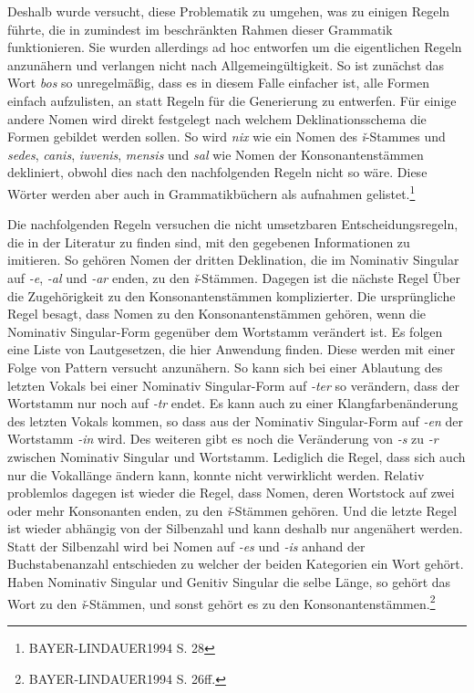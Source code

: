 \documentclass[12pt,abstract=on]{scrreprt}
\begin{document}
Deshalb wurde versucht, diese Problematik zu umgehen, was zu einigen Regeln führte, die in zumindest im beschränkten Rahmen dieser Grammatik funktionieren. Sie wurden allerdings ad hoc entworfen um die eigentlichen Regeln anzunähern und verlangen nicht nach Allgemeingültigkeit. So ist zunächst das Wort \textit{bos} so unregelmäßig, dass es in diesem Falle einfacher ist, alle Formen einfach aufzulisten, an statt Regeln für die Generierung zu entwerfen. Für einige andere Nomen wird direkt festgelegt nach welchem Deklinationsschema die Formen gebildet werden sollen. So wird \textit{nix} wie ein Nomen des \textit{ǐ}-Stammes und \textit{sedes}, \textit{canis}, \textit{iuvenis}, \textit{mensis} und \textit{sal} wie Nomen der Konsonantenstämmen dekliniert, obwohl dies nach den nachfolgenden Regeln nicht so wäre. Diese Wörter werden aber auch in Grammatikbüchern als aufnahmen gelistet.\footnote{BAYER-LINDAUER1994 S. 28} \par
Die nachfolgenden Regeln versuchen die nicht umsetzbaren Entscheidungsregeln, die in der Literatur zu finden sind, mit den gegebenen Informationen zu imitieren. So gehören Nomen der dritten Deklination, die im Nominativ Singular auf \textit{-e}, \textit{-al} und \textit{-ar} enden, zu den \textit{ǐ}-Stämmen. Dagegen ist die nächste Regel Über die Zugehörigkeit zu den Konsonantenstämmen komplizierter. Die ursprüngliche Regel besagt, dass Nomen zu den Konsonantenstämmen gehören, wenn die Nominativ Singular-Form gegenüber dem Wortstamm verändert ist. Es folgen eine Liste von Lautgesetzen, die hier Anwendung finden. Diese werden mit einer Folge von Pattern versucht anzunähern. So kann sich bei einer Ablautung des letzten Vokals bei einer Nominativ Singular-Form auf \textit{-ter} so verändern, dass der Wortstamm nur noch auf \textit{-tr} endet. Es kann auch zu einer Klangfarbenänderung des letzten Vokals kommen, so dass aus der Nominativ Singular-Form auf \textit{-en} der Wortstamm \textit{-in} wird. Des weiteren gibt es noch die Veränderung von \textit{-s} zu \textit{-r} zwischen Nominativ Singular und Wortstamm. Lediglich die Regel, dass sich auch nur die Vokallänge ändern kann, konnte nicht verwirklicht werden. Relativ problemlos dagegen ist wieder die Regel, dass Nomen, deren Wortstock auf zwei oder mehr Konsonanten enden, zu den \textit{ǐ}-Stämmen gehören. Und die letzte Regel ist wieder abhängig von der Silbenzahl und kann deshalb nur angenähert werden. Statt der Silbenzahl wird bei Nomen auf \textit{-es} und \textit{-is} anhand der Buchstabenanzahl entschieden zu welcher der beiden Kategorien ein Wort gehört. Haben Nominativ Singular und Genitiv Singular die selbe Länge, so gehört das Wort zu den \textit{ǐ}-Stämmen, und sonst gehört es zu den Konsonantenstämmen.\footnote{BAYER-LINDAUER1994 S. 26ff.} \par
\end{document}
